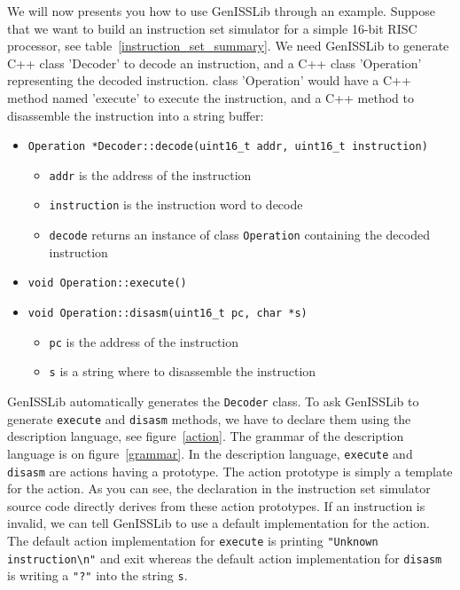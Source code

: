 We will now presents you how to use GenISSLib through an example. Suppose that we want to build an instruction set simulator for
a simple 16-bit RISC processor, see table~\ref{instruction_set_summary}. We need GenISSLib to generate C++ class 'Decoder' to decode an instruction, and a C++ class 'Operation' representing the decoded instruction.
class 'Operation' would have a C++ method named 'execute' to execute the instruction, and a C++ method to disassemble the instruction into a string buffer:
\begin{itemize}
	\item \texttt{Operation *Decoder::decode(uint16\_t addr, uint16\_t instruction)}
	\begin{itemize}
		\item \texttt{addr} is the address of the instruction
		\item \texttt{instruction} is the instruction word to decode
		\item \texttt{decode} returns an instance of class \texttt{Operation} containing the decoded instruction
	\end{itemize}
	\item \texttt{void Operation::execute()}
	\item \texttt{void Operation::disasm(uint16\_t pc, char *s)}
	\begin{itemize}
		\item \texttt{pc} is the address of the instruction
		\item \texttt{s} is a string where to disassemble the instruction
	\end{itemize}
\end{itemize}

GenISSLib automatically generates the \texttt{Decoder} class. To ask GenISSLib to generate \texttt{execute} and \texttt{disasm} methods, we have
to declare them using the description language, see figure~\ref{action}. The grammar of the description language is on figure~\ref{grammar}. In the description language, \texttt{execute} and \texttt{disasm} are actions having a prototype.
The action prototype is simply a template for the action. As you can see, the declaration in the instruction set simulator source code directly derives
from these action prototypes. If an instruction is invalid, we can tell GenISSLib to use a default implementation for the action. The default
action implementation for \texttt{execute} is printing \texttt{"Unknown instruction\textbackslash n"} and exit whereas the default action implementation
for \texttt{disasm} is writing a \texttt{"?"} into the string \texttt{s}.

